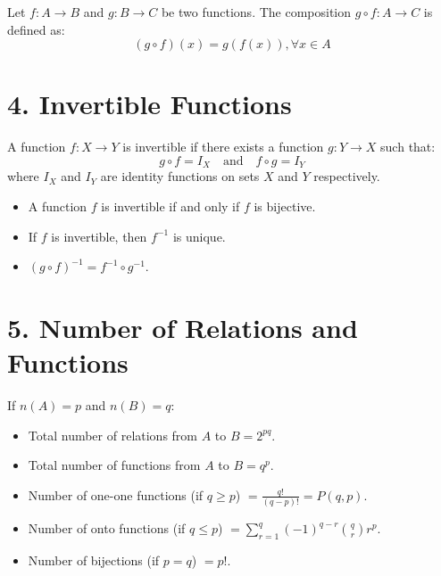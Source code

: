 \documentclass[12pt, a4paper]{article}
\begin{document}
Let $f: A \to B$ and $g: B \to C$ be two functions. The composition $g \circ f: A \to C$ is defined as:
\[ (g \circ f)(x) = g(f(x)), \forall x \in A \]

\section*{4. Invertible Functions}

A function $f: X \to Y$ is invertible if there exists a function $g: Y \to X$ such that:
\[ g \circ f = I_X \quad \text{and} \quad f \circ g = I_Y \]
where $I_X$ and $I_Y$ are identity functions on sets $X$ and $Y$ respectively.

\begin{itemize}
    \item A function $f$ is invertible if and only if $f$ is bijective.
    \item If $f$ is invertible, then $f^{-1}$ is unique.
    \item $(g \circ f)^{-1} = f^{-1} \circ g^{-1}$.
\end{itemize}

\section*{5. Number of Relations and Functions}

If $n(A) = p$ and $n(B) = q$:
\begin{itemize}
    \item Total number of relations from $A$ to $B = 2^{pq}$.
    \item Total number of functions from $A$ to $B = q^p$.
    \item Number of one-one functions (if $q \geq p$) $= \frac{q!}{(q-p)!} = P(q, p)$.
    \item Number of onto functions (if $q \leq p$) $= \sum_{r=1}^{q} (-1)^{q-r} \binom{q}{r} r^p$.
    \item Number of bijections (if $p = q$) $= p!$.
\end{itemize}
\end{document}
